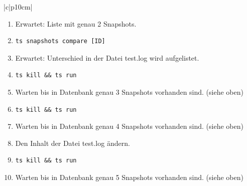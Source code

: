 \documentclass[a4paper,12pt]{report}
\begin{document}
\begin{table}[h!]
\begin{tabular}{|c|p{10cm}|}
\begin{enumerate}
\begin{verbatim}
                \end{verbatim}
                \item Erwartet: Liste mit genau 2 Snapshots.
                \item \begin{verbatim}ts snapshots compare [ID]
                \end{verbatim}
                \item Erwartet: Unterschied in der Datei test.log wird aufgelistet.
                \item \begin{verbatim}ts kill && ts run
                \end{verbatim}
                \item Warten bis in Datenbank genau 3 Snapshots vorhanden sind.
                (siehe oben)
                \item \begin{verbatim}ts kill && ts run
                \end{verbatim}
                \item Warten bis in Datenbank genau 4 Snapshots vorhanden sind.
                (siehe oben)
                \item Den Inhalt der Datei test.log ändern.
                \item \begin{verbatim}ts kill && ts run
                \end{verbatim}
                \item Warten bis in Datenbank genau 5 Snapshots vorhanden sind.
                (siehe oben)
            \end{enumerate} \\ \hline
        \end{tabular}\label{tab:e2e-7.1}
    \end{table}
    \clearpage
\end{document}
